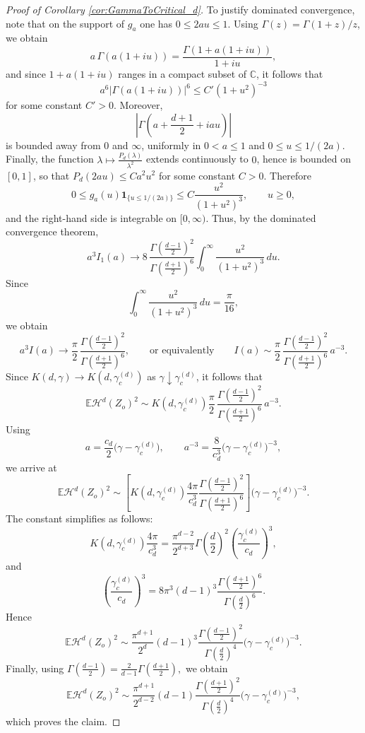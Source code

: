 \documentclass[11pt,a4paper]{article}
\theoremstyle{plain}
\theoremstyle{definition}
\theoremstyle{remark}
\def\CC{\mathbb{C}}
\def\EE{\mathbb{E}}
\def\cH{\mathcal{H}}
\begin{document}
\begin{proof}[Proof of Corollary \ref{cor:GammaToCritical_d}]
	To justify dominated convergence, note that on the support of \(g_a\) one has
	\(0\le 2au\le1\). Using \(\Gamma(z)=\Gamma(1+z)/z\), we obtain
	\[
	a\,\Gamma(a(1+iu))
	=
	\frac{\Gamma(1+a(1+iu))}{1+iu},
	\]
	and since \(1+a(1+iu)\) ranges in a compact subset of \(\CC\), it follows that
	\[
	a^6|\Gamma(a(1+iu))|^6\le C'(1+u^2)^{-3}
	\]
    for some constant $C'>0$.
	Moreover,
	\[
	\left|\Gamma\!\left(a+\frac{d+1}{2}+iau\right)\right|
	\]
	is bounded away from \(0\) and \(\infty\), uniformly in \(0<a\le1\) and
	\(0\le u\le 1/(2a)\). Finally, the function
	$
	\lambda\mapsto \frac{P_d(\lambda)}{\lambda^2}
	$
	extends continuously to \(0\), hence is bounded on \([0,1]\), so that
	$
	P_d(2au)\le C a^2u^2
	$ for some constant $C>0$.
	Therefore
	\[
	0\le g_a(u)\mathbf 1_{\{u\le1/(2a)\}}
	\le C\frac{u^2}{(1+u^2)^3},
	\qquad u\ge0,
	\]
	and the right-hand side is integrable on \([0,\infty)\). Thus, by the dominated convergence theorem,
	\[
	a^3 I_1(a)
	\longrightarrow
	8\,\frac{\Gamma\!\left(\frac{d-1}{2}\right)^2}{
		\Gamma\!\left(\frac{d+1}{2}\right)^6}
	\int_0^\infty \frac{u^2}{(1+u^2)^3}\,du.
	\]
	Since
	\[
	\int_0^\infty \frac{u^2}{(1+u^2)^3}\,du=\frac{\pi}{16},
	\]
	we obtain
	\[
	a^3 I(a)\longrightarrow
	\frac{\pi}{2}\,
	\frac{\Gamma\!\left(\frac{d-1}{2}\right)^2}{
		\Gamma\!\left(\frac{d+1}{2}\right)^6},\qquad\text{or equivalently}\qquad I(a)\sim
	\frac{\pi}{2}\,
	\frac{\Gamma\!\left(\frac{d-1}{2}\right)^2}{
		\Gamma\!\left(\frac{d+1}{2}\right)^6}\,
	a^{-3}.
	\]
	Since \(K(d,\gamma)\to K(d,\gamma_c^{(d)})\) as \(\gamma\downarrow\gamma_c^{(d)}\), it follows that
	\[
	\EE\cH^d(Z_o)^2
	\sim
	K(d,\gamma_c^{(d)})
	\frac{\pi}{2}\,
	\frac{\Gamma\!\left(\frac{d-1}{2}\right)^2}{
		\Gamma\!\left(\frac{d+1}{2}\right)^6}\,
	a^{-3}.
	\]
	Using
	\[
	a=\frac{c_d}{2}\bigl(\gamma-\gamma_c^{(d)}\bigr),
	\qquad
	a^{-3}=\frac{8}{c_d^3}\bigl(\gamma-\gamma_c^{(d)}\bigr)^{-3},
	\]
	we arrive at
	\[
	\EE\cH^d(Z_o)^2
	\sim
	\left[
	K(d,\gamma_c^{(d)})
	\frac{4\pi}{c_d^3}
	\frac{\Gamma\!\left(\frac{d-1}{2}\right)^2}{
		\Gamma\!\left(\frac{d+1}{2}\right)^6}
	\right]
	\bigl(\gamma-\gamma_c^{(d)}\bigr)^{-3}.
	\]
	The constant simplifies as follows:
	\[
	K(d,\gamma_c^{(d)}) \frac{4\pi}{c_d^3}
	=
	\frac{\pi^{d-2}}{2^{d+3}} \Gamma\!\left(\frac d2\right)^2
	\left(\frac{\gamma_c^{(d)}}{c_d}\right)^3,
	\]
	and
	\[
	\left(\frac{\gamma_c^{(d)}}{c_d}\right)^3
	=
	8\pi^3(d-1)^3
	\frac{\Gamma\!\left(\frac{d+1}{2}\right)^6}{
		\Gamma\!\left(\frac d2\right)^6}.
	\]
	Hence
	\[
	\EE\cH^d(Z_o)^2
	\sim
	\frac{\pi^{d+1}}{2^d}(d-1)^3
	\frac{\Gamma\!\left(\frac{d-1}{2}\right)^2}{
		\Gamma\!\left(\frac d2\right)^4}
	\bigl(\gamma-\gamma_c^{(d)}\bigr)^{-3}.
	\]
	Finally, using
	$
	\Gamma\!\left(\frac{d-1}{2}\right)
	=
	\frac{2}{d-1}\Gamma\!\left(\frac{d+1}{2}\right),
	$
	we obtain
	\[
	\EE\cH^d(Z_o)^2
	\sim
	\frac{\pi^{d+1}}{2^{d-2}}(d-1)
	\frac{\Gamma\!\left(\frac{d+1}{2}\right)^2}{
		\Gamma\!\left(\frac d2\right)^4}
	\bigl(\gamma-\gamma_c^{(d)}\bigr)^{-3},
	\]
	which proves the claim.
\end{proof}
\end{document}
